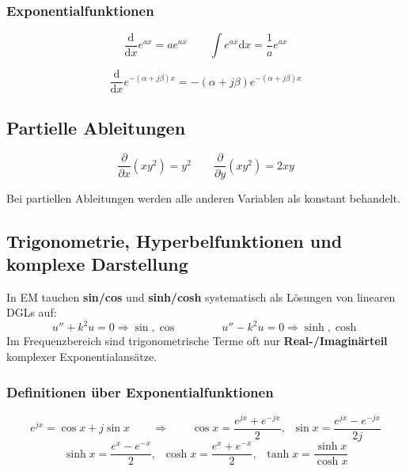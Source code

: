 \documentclass[a4paper]{article}
\renewcommand{\dd}{\mathrm{d}}
\begin{document}
\subsubsection{Exponentialfunktionen}

\[
\frac{\dd}{\dd x} e^{ax} = a e^{ax}
\qquad
\int e^{ax}\dd x = \frac{1}{a}e^{ax}
\]

\[
\frac{\dd}{\dd x} e^{-(\alpha+j\beta)x}
=-(\alpha+j\beta)e^{-(\alpha+j\beta)x}
\]

\subsection{Partielle Ableitungen}

\[
\frac{\partial}{\partial x}(xy^2)=y^2
\qquad
\frac{\partial}{\partial y}(xy^2)=2xy
\]

\begin{schema}
Bei partiellen Ableitungen werden alle anderen Variablen als konstant behandelt.
\end{schema}

\subsection{Trigonometrie, Hyperbelfunktionen und komplexe Darstellung}

\begin{merke}
In EM tauchen \textbf{sin/cos} und \textbf{sinh/cosh} systematisch als Lösungen von linearen DGLs auf:
\[
u'' + k^2 u = 0 \Rightarrow \sin,\cos
\qquad\qquad
u'' - k^2 u = 0 \Rightarrow \sinh,\cosh
\]
Im Frequenzbereich sind trigonometrische Terme oft nur \textbf{Real-/Imaginärteil} komplexer Exponentialansätze.
\end{merke}

\subsubsection{Definitionen über Exponentialfunktionen }
\begin{schema}
\[
e^{jx} = \cos x + j\sin x
\qquad\Rightarrow\qquad
\cos x = \frac{e^{jx}+e^{-jx}}{2},\;\;
\sin x = \frac{e^{jx}-e^{-jx}}{2j}
\]
\[
\sinh x = \frac{e^{x}-e^{-x}}{2},\;\;
\cosh x = \frac{e^{x}+e^{-x}}{2},\;\;
\tanh x = \frac{\sinh x}{\cosh x}
\]
\end{schema}
\end{document}

